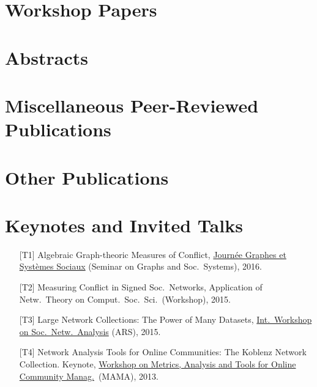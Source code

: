 \documentclass[line,margin]{res}
\newcounter{x}
\begin{document}
\begin{resume}
\section{Workshop Papers}    
\section{Abstracts}          
\section{Miscellaneous Peer-Reviewed Publications}	
\section{Other Publications} 

\section{Keynotes and Invited Talks}
\begin{itemize}
\item[{[T1]}] Algebraic Graph-theoric Measures of Conflict, 
  \href{http://jgss.sciencesconf.org/}{Journée Graphes et Systèmes
    Sociaux} (Seminar on Graphs and Soc.\ Systems), 2016.  
\item[{[T2]}] Measuring Conflict in Signed Soc.\ Networks, 
  Application of Netw.\ Theory on Comput.\ Soc.\ Sci.\ (Workshop), 2015.
\item[{[T3]}] Large Network Collections:  The Power of Many Datasets,
  \href{http://www.ars15.unisa.it/}{Int.\ Workshop on Soc.\ Netw.\ Analysis} (ARS), 2015. 
\item[{[T4]}] Network Analysis Tools for Online Communities: The Koblenz Network
  Collection. Keynote, \href{http://mama.west.uni-koblenz.de/}{Workshop
    on Metrics, Analysis and Tools for Online Community Manag.}\ (MAMA), 2013.  
\end{itemize}


\end{resume}
\end{document}
